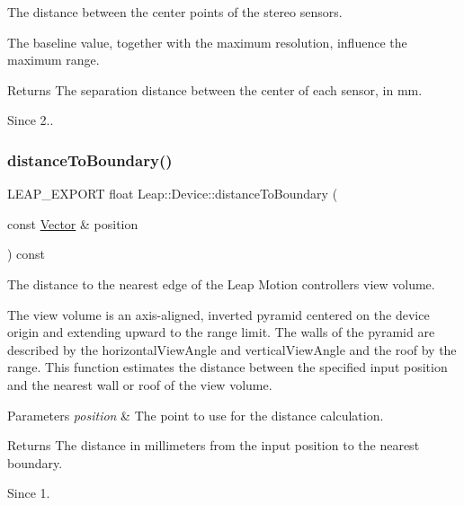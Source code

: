 The distance between the center points of the stereo sensors.

The baseline value, together with the maximum resolution, influence the maximum range.

\begin{DoxyReturn}{Returns}
The separation distance between the center of each sensor, in mm. 
\end{DoxyReturn}
\begin{DoxySince}{Since}
2.. 
\end{DoxySince}
\mbox{\label{class_leap_1_1_device_aefca616eabf05ac048539a65feb2749d}} 
\subsubsection{\texorpdfstring{distance\+To\+Boundary()}{distanceToBoundary()}}
{\footnotesize\ttfamily L\+E\+A\+P\+\_\+\+E\+X\+P\+O\+RT float Leap\+::\+Device\+::distance\+To\+Boundary (\begin{DoxyParamCaption}\item[{const \hyperlink{struct_leap_1_1_vector}{Vector} \&}]{position }\end{DoxyParamCaption}) const}

The distance to the nearest edge of the Leap Motion controller\textquotesingle{}s view volume.

The view volume is an axis-\/aligned, inverted pyramid centered on the device origin and extending upward to the range limit. The walls of the pyramid are described by the horizontal\+View\+Angle and vertical\+View\+Angle and the roof by the range. This function estimates the distance between the specified input position and the nearest wall or roof of the view volume.


\begin{DoxyCodeInclude}
\end{DoxyCodeInclude}



\begin{DoxyParams}{Parameters}
{\em position} & The point to use for the distance calculation. \\
\hline
\end{DoxyParams}
\begin{DoxyReturn}{Returns}
The distance in millimeters from the input position to the nearest boundary. 
\end{DoxyReturn}
\begin{DoxySince}{Since}
1. 
\end{DoxySince}
\mbox{\label{class_leap_1_1_device_aea496995019d62785d7ec404751e531b}} 
